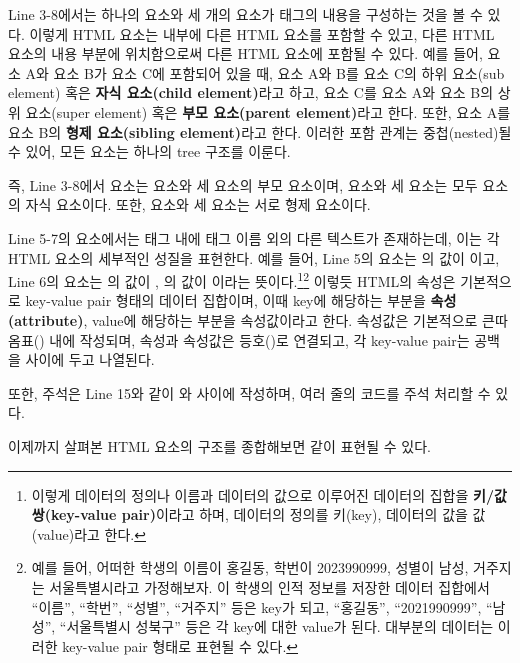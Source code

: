 Line 3-8에서는 하나의  요소와 세 개의  요소가  태그의 내용을 구성하는 것을 볼 수 있다. 이렇게 HTML 요소는 내부에 다른 HTML 요소를 포함할 수 있고, 다른 HTML 요소의 내용 부분에 위치함으로써 다른 HTML 요소에 포함될 수 있다. 예를 들어, 요소 A와 요소 B가 요소 C에 포함되어 있을 때, 요소 A와 B를 요소 C의 하위 요소(sub element) 혹은 \textbf{자식 요소(child element)}라고 하고, 요소 C를 요소 A와 요소 B의 상위 요소(super element) 혹은 \textbf{부모 요소(parent element)}라고 한다. 또한, 요소 A를 요소 B의 \textbf{형제 요소(sibling element)}라고 한다. 이러한 포함 관계는 중첩(nested)될 수 있어, 모든 요소는 하나의 tree 구조를 이룬다.

즉, Line 3-8에서  요소는  요소와 세  요소의 부모 요소이며,  요소와 세  요소는 모두  요소의 자식 요소이다. 또한,  요소와 세  요소는 서로 형제 요소이다.

Line 5-7의  요소에서는 태그 내에 태그 이름 외의 다른 텍스트가 존재하는데, 이는 각 HTML 요소의 세부적인 성질을 표현한다. 예를 들어, Line 5의  요소는 의 값이 이고, Line 6의  요소는 의 값이 , 의 값이 이라는 뜻이다.\footnote{이렇게 데이터의 정의나 이름과 데이터의 값으로 이루어진 데이터의 집합을 \textbf{키/값 쌍(key-value pair)}이라고 하며, 데이터의 정의를 키(key), 데이터의 값을 값(value)라고 한다.}\footnote{예를 들어, 어떠한 학생의 이름이 홍길동, 학번이 2023990999, 성별이 남성, 거주지는 서울특별시라고 가정해보자. 이 학생의 인적 정보를 저장한 데이터 집합에서 ``이름'', ``학번'', ``성별'', ``거주지'' 등은 key가 되고, ``홍길동'', ``2021990999'', ``남성'', ``서울특별시 성북구'' 등은 각 key에 대한 value가 된다. 대부분의 데이터는 이러한 key-value pair 형태로 표현될 수 있다.} 이렇듯 HTML의 속성은 기본적으로 key-value pair 형태의 데이터 집합이며, 이때 key에 해당하는 부분을 \textbf{속성(attribute)}, value에 해당하는 부분을 속성값이라고 한다. 속성값은 기본적으로 큰따옴표() 내에 작성되며, 속성과 속성값은 등호(\cd{=})로 연결되고, 각 key-value pair는 공백을 사이에 두고 나열된다.

또한, 주석은 Line 15와 같이 \cd{<!--}와 \cd{-->} 사이에 작성하며, 여러 줄의 코드를 주석 처리할 수 있다.

이제까지 살펴본 HTML 요소의 구조를 종합해보면 \와 같이 표현될 수 있다.

    {}

